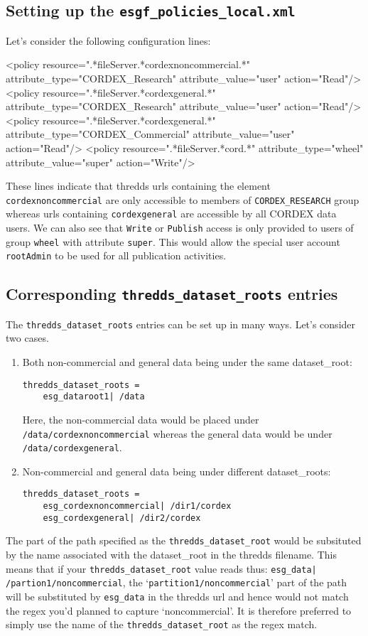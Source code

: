 \subsection{Setting up the \texttt{esgf\_policies\_local.xml}}
Let's consider the following configuration lines:
\begin{tiny}
\begin{verbatimtab}[4]
<policy resource=".*fileServer.*cordexnoncommercial.*" attribute_type="CORDEX_Research" attribute_value="user" action="Read"/>
<policy resource=".*fileServer.*cordexgeneral.*" attribute_type="CORDEX_Research" attribute_value="user" action="Read"/>
<policy resource=".*fileServer.*cordexgeneral.*" attribute_type="CORDEX_Commercial" attribute_value="user" action="Read"/>
<policy resource=".*fileServer.*cord.*" attribute_type="wheel" attribute_value="super" action="Write"/>
\end{verbatimtab}
\end{tiny}
These lines indicate that thredds urls containing the element \texttt{cordexnoncommercial} are only accessible to members of \texttt{CORDEX\_RESEARCH} group whereas urls containing \texttt{cordexgeneral} are accessible by all CORDEX data users. We can also see that \texttt{Write} or \texttt{Publish} access is only provided to users of group \texttt{wheel} with attribute \texttt{super}. This would allow the special user account \texttt{rootAdmin} to be used for all publication activities.
\subsection{Corresponding \texttt{thredds\_dataset\_roots} entries}
The \texttt{thredds\_dataset\_roots} entries can be set up in many ways.  Let's consider two cases.
\begin{enumerate}
\item Both non-commercial and general data being under the same dataset\_root:
\begin{verbatim}
thredds_dataset_roots =
	esg_dataroot1| /data
\end{verbatim}
Here, the non-commercial data would be placed under \texttt{/data/cordexnoncommercial} whereas the general data would be under \texttt{/data/cordexgeneral}.
\item Non-commercial and general data being under different dataset\_roots:
\begin{verbatim}
thredds_dataset_roots =
	esg_cordexnoncommercial| /dir1/cordex
	esg_cordexgeneral| /dir2/cordex
\end{verbatim}
\end{enumerate}
 The part of the path specified as the \texttt{thredds\_dataset\_root} would be subsituted by the name associated with the dataset\_root in the thredds filename. This means that if your \texttt{thredds\_dataset\_root} value reads thus: \texttt{esg\_data| /partion1/noncommercial}, the `\texttt{partition1/noncommercial}' part of the path will be substituted by \texttt{esg\_data} in the thredds url and hence would not match the regex you'd planned to capture `noncommercial'.  It is therefore preferred to simply use the name of the \texttt{thredds\_dataset\_root} as the regex match.
